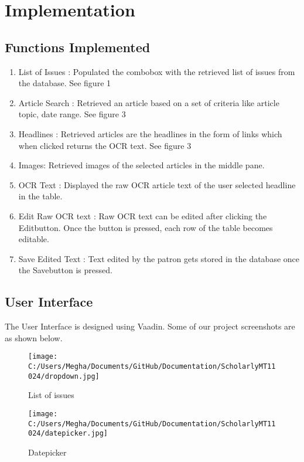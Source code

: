 \documentclass[amsart, 12pt]{article}
\begin{document}
\section{Implementation}
\subsection{Functions Implemented}
\begin{enumerate}
\item List of Issues : Populated the combobox with the retrieved list of issues from the database. See figure 1
\item Article Search : Retrieved an article based on a set of criteria like article topic, date range. See figure 3
\item Headlines : Retrieved articles are the headlines in the form of links which when clicked returns the OCR text. See figure 3
\item Images: Retrieved images of the selected articles in the middle pane.
\item OCR Text : Displayed the raw OCR article text of the user selected headline in the table.
\item Edit Raw OCR text : Raw OCR text can be edited after clicking the \textasciigrave Edit\textasciiacute button. Once the button is pressed, each row of the table becomes editable.
\item Save Edited Text : Text edited by the patron gets stored in the database once the \textasciigrave Save\textasciiacute button is pressed.
\end{enumerate}

\subsection{User Interface}
The User Interface is designed using Vaadin. Some of our project screenshots are as shown below.

\begin{figure}[H]
\centering
\texttt{[image: C:/Users/Megha/Documents/GitHub/Documentation/ScholarlyMT11024/dropdown.jpg]}
\caption{List of issues}
\label{fig:Phase 1}
\end{figure}

\begin{figure}[H]
\centering
\texttt{[image: C:/Users/Megha/Documents/GitHub/Documentation/ScholarlyMT11024/datepicker.jpg]}
\caption{Datepicker}
\label{fig:Phase 2}
\end{figure}
\end{document}
